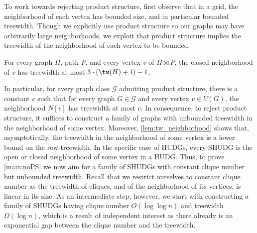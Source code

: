 %
To work towards rejecting product structure, first observe that in a grid, the neighborhood of each vertex has bounded size, and in particular bounded treewidth.
Though we explicitly use product structure so our graphs may have arbitrarily large neighborhoods, we exploit that product structure implies the treewidth of the neighborhood of each vertex to be bounded.
%
\begin{lemma}\label{lem:tw_neighborhood}%
\label{lem:PS_neighboorhood}
    For every graph $H$, path $ P $, and every vertex $v$ of $ H \boxtimes P $, the closed neighborhood of $v$ has treewidth at most $ 3 \cdot (\tw(H) + 1) - 1 $.
\end{lemma}
%
In particular, for every graph class $ \mathcal{G} $ admitting product structure, there is a constant $c$ such that for every graph $G \in \mathcal{G}$ and every vertex $v \in V(G)$, the neighborhood $ N[v] $ has treewidth at most $c$.
In consequence, to reject product structure, it suffices to construct a family of graphs with unbounded treewidth in the neighborhood of some vertex.
Moreover, \cref{lem:tw_neighborhood} shows that, asymptotically, the treewidth in the neighborhood of some vertex is a lower bound on the row-treewidth.
In the specific case of HUDGs, every SHUDG is the open or closed neighborhood of some vertex in a HUDG.
Thus, to prove \cref{main:noPS} we now aim for a family of SHUDGs with constant clique number but unbounded treewidth.
%
Recall that we restrict ourselves to constant clique number as the treewidth of cliques, and of the neighborhood of its vertices, is linear in its size.
As an intermediate step, however, we start with constructing a family of SHUDGs having clique number $O(\log \log n)$ and treewidth $\Omega(\log n)$, which is a result of independent interest as there already is an exponential gap between the clique number and the treewidth.

